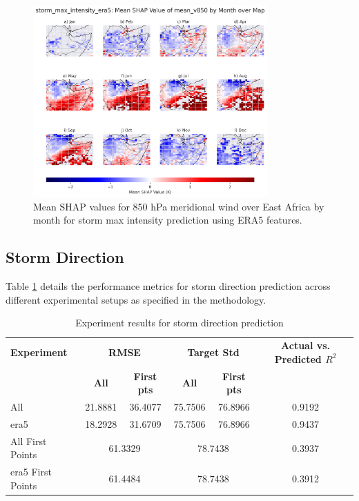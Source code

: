 \begin{figure}[ht]
    \centering
    \includegraphics[width=0.8\textwidth]{../figures/generated/experiments/storm_max_intensity/geographic_corr/storm_max_intensity_era5_shap_mean_v850_map_by_month.png}
    \caption{Mean SHAP values for 850 hPa meridional wind over East Africa by month for storm max intensity prediction using ERA5 features.}
    \label{fig:storm_max_intensity_era5_shap_mean_v850_map_by_month}
\end{figure}

\subsection{Storm Direction}

Table \ref{tab:storm_direction_results} details the performance metrics for storm direction prediction across different experimental setups as specified in the methodology.

\begin{table}[ht]
\centering
\caption{Experiment results for storm direction prediction}
\label{tab:storm_direction_results}
\begin{tabular}{lccccc}
\hline
\textbf{Experiment} & \multicolumn{2}{c}{\textbf{RMSE}} & \multicolumn{2}{c}{\textbf{Target Std}} & \textbf{Actual vs. Predicted $R^2$} \\
\cline{2-5}
 & \textbf{All} & \textbf{First pts} & \textbf{All} & \textbf{First pts} &  \\
\hline
All              & 21.8881 & 36.4077 & 75.7506 & 76.8966 & 0.9192 \\
\acrshort{era5}             & 18.2928 & 31.6709 & 75.7506 & 76.8966 & 0.9437 \\
All First Points & \multicolumn{2}{c}{61.3329} & \multicolumn{2}{c}{78.7438} & 0.3937 \\
\acrshort{era5} First Points & \multicolumn{2}{c}{61.4484} & \multicolumn{2}{c}{78.7438} & 0.3912 \\
\hline
\end{tabular}
\end{table}

